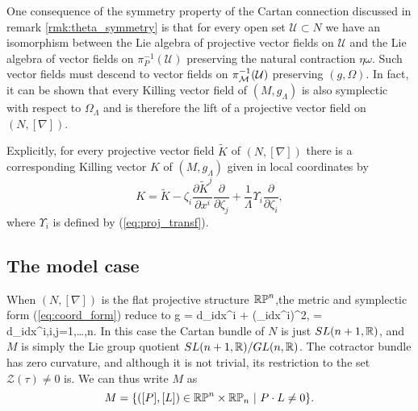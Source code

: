 One consequence of the symmetry property of the Cartan connection discussed in remark \ref{rmk:theta_symmetry} is that for every open set $\mathcal{U}\subset N$ we have an isomorphism between the Lie algebra of projective vector fields on $\mathcal{U}$ and the Lie algebra of vector fields on $\pi_P^{-1}(\mathcal{U})$ preserving the natural contraction $\eta\omega$. Such vector fields must descend to vector fields on $\pi_{\mathcal{M}}^{-1}(\mathcal{U})$ preserving $(g,\Omega)$. In fact, it can be shown that every Killing vector field of $(M,g_\Lambda)$ is also symplectic with respect to $\Omega_\Lambda$ and is therefore the lift of a projective vector field on $(N,[\nabla])$.

Explicitly, for every projective vector field $\tilde{K}$ of $(N,[\nabla])$
there is a corresponding Killing vector $K$ of $(M,g_{\Lambda})$
given in local coordinates by 
\begin{equation}
{K}=\tilde{K}-\zeta_{i}\frac{\partial \tilde{K}^{j}}{\partial x^{i}}\frac{\partial}{\partial \zeta_{j}}+\frac{1}{\Lambda}\Upsilon_{i}\frac{\partial}{\partial \zeta_{i}},\label{eq:kvf_from_pvf}
\end{equation}
where $\Upsilon_{i}$ is defined by (\ref{eq:proj_transf}).

\subsection{The model case} \label{sec:intro_model}
When $(N,[\nabla])$ is the flat projective structure $\mathbb{RP}^n$,the metric and symplectic form (\ref{eq:coord_form}) reduce to
\be \label{eq:intro_model_g}
g = d\zeta_i\odot dx^i + (\zeta_idx^i)^2, \quad \Omega = d\zeta_i\wedge dx^i,\quad i,j=1,\dots,n.
\ee
In this case the Cartan bundle of $N$ is just $SL(n+1,\mathbb{R})$, and $M$ is simply the Lie group quotient $SL(n+1,\mathbb{R})/GL(n,\mathbb{R})$. The cotractor bundle has zero curvature, and although it is not trivial, its restriction to the set $\mathcal{Z}(\tau)\neq 0$ is. %
We can thus write $M$ as
\[
M=\{([P],[L])\in\RP^n\times\RP_n\ |\ P\cdot L\neq 0\}.
\]

